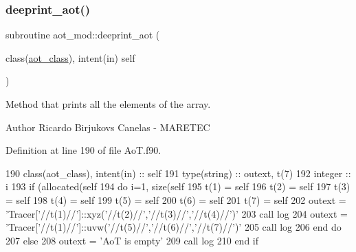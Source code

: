 \subsubsection{\texorpdfstring{deeprint\+\_\+aot()}{deeprint\_aot()}}
{\footnotesize\ttfamily subroutine aot\+\_\+mod\+::deeprint\+\_\+aot (\begin{DoxyParamCaption}\item[{class(\mbox{\hyperlink{structaot__mod_1_1aot__class}{aot\+\_\+class}}), intent(in)}]{self }\end{DoxyParamCaption})\hspace{0.3cm}{\ttfamily [private]}}



Method that prints all the elements of the array. 

\begin{DoxyAuthor}{Author}
Ricardo Birjukovs Canelas -\/ M\+A\+R\+E\+T\+EC 
\end{DoxyAuthor}


Definition at line 190 of file Ao\+T.\+f90.


\begin{DoxyCode}
190     \textcolor{keywordtype}{class}(aot\_class), \textcolor{keywordtype}{intent(in)} :: self
191     \textcolor{keywordtype}{type}(string) :: outext, t(7)
192     \textcolor{keywordtype}{integer} :: i
193     \textcolor{keywordflow}{if} (\textcolor{keyword}{allocated}(self%
194         \textcolor{keywordflow}{do} i=1, \textcolor{keyword}{size}(self%
195             t(1) = self%
196             t(2) = self%
197             t(3) = self%
198             t(4) = self%
199             t(5) = self%
200             t(6) = self%
201             t(7) = self%
202             outext = \textcolor{stringliteral}{'Tracer['}//t(1)//\textcolor{stringliteral}{']::xyz('}//t(2)//\textcolor{stringliteral}{','}//t(3)//\textcolor{stringliteral}{','}//t(4)//\textcolor{stringliteral}{')'}
203             \textcolor{keyword}{call }log%
204             outext = \textcolor{stringliteral}{'Tracer['}//t(1)//\textcolor{stringliteral}{']::uvw('}//t(5)//\textcolor{stringliteral}{','}//t(6)//\textcolor{stringliteral}{','}//t(7)//\textcolor{stringliteral}{')'}
205             \textcolor{keyword}{call }log%
206 \textcolor{keywordflow}{        end do}
207     \textcolor{keywordflow}{else}
208         outext = \textcolor{stringliteral}{'AoT is empty'}
209         \textcolor{keyword}{call }log%
210 \textcolor{keywordflow}{    end if}
\end{DoxyCode}
\mbox{\label{namespaceaot__mod_aa6ef0ed7c67e66bf04e7aa0070bbde7f}} 
